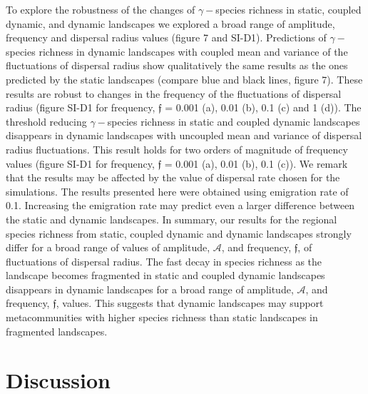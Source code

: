 \documentclass[12pt]{article}
\begin{document}
To explore the robustness of the changes of $\gamma-$species richness in static, coupled dynamic, and dynamic landscapes we explored a broad range of amplitude, frequency and dispersal radius values (figure 7 and SI-D1). Predictions of $\gamma-$species richness in dynamic landscapes with coupled mean and variance of the fluctuations of dispersal radius show qualitatively the same results as the ones predicted by the static landscapes (compare blue and black lines, figure 7). These results are robust to changes in the frequency of the fluctuations of dispersal radius (figure SI-D1 for frequency, $\mathfrak{f}$ = 0.001 (a), 0.01 (b), 0.1 (c) and 1 (d)). The threshold reducing $\gamma-$species richness in static and coupled dynamic landscapes disappears in dynamic landscapes with uncoupled mean and variance of dispersal radius fluctuations. This result holds for two orders of magnitude of frequency values (figure SI-D1 for frequency, $\mathfrak{f}$ = 0.001 (a), 0.01 (b), 0.1 (c)). We remark that the results may be affected by the value of dispersal rate chosen for the simulations. The results presented here were obtained using emigration rate of 0.1. Increasing the emigration rate may predict even a larger difference between the static and dynamic landscapes. In summary, our results for the regional species richness from static, coupled dynamic and dynamic landscapes strongly differ for a broad range of values of amplitude, $\mathcal{A}$, and frequency, $\mathfrak{f}$, of fluctuations of dispersal radius. The fast decay in species richness as the landscape becomes fragmented in static and coupled dynamic landscapes disappears in dynamic landscapes for a broad range of amplitude, $\mathcal{A}$, and frequency, $\mathfrak{f}$, values. This suggests that dynamic landscapes may support metacommunities with higher species richness than static landscapes in fragmented landscapes.

\section*{Discussion}
\end{document}
